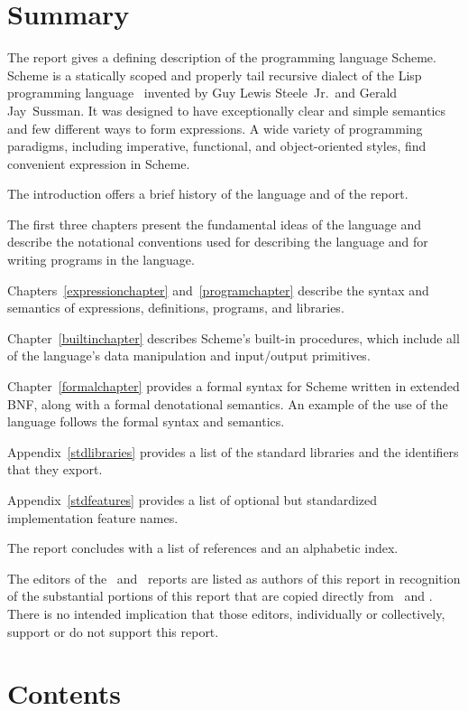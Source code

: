 \chapter*{Summary}

The report gives a defining description of the programming language
Scheme.  Scheme is a statically scoped and properly tail recursive
dialect of the Lisp programming language~\cite{McCarthy} invented by Guy Lewis
Steele~Jr.\ and Gerald Jay~Sussman.  It was designed to have
exceptionally clear and simple semantics and few different ways to
form expressions.  A wide variety of programming paradigms, including
imperative, functional, and object-oriented styles, find convenient
expression in Scheme.

\vest The introduction offers a brief history of the language and of
the report.

\vest The first three chapters present the fundamental ideas of the
language and describe the notational conventions used for describing the
language and for writing programs in the language.

\vest Chapters~\ref{expressionchapter} and~\ref{programchapter} describe
the syntax and semantics of expressions, definitions, programs, and libraries.

\vest Chapter~\ref{builtinchapter} describes Scheme's built-in
procedures, which include all of the language's data manipulation and
input/output primitives.

\vest Chapter~\ref{formalchapter} provides a formal syntax for Scheme
written in extended BNF, along with a formal denotational semantics.
An example of the use of the language follows the formal syntax and
semantics.

\vest Appendix~\ref{stdlibraries} provides a list of the standard libraries
and the identifiers that they export.

\vest Appendix~\ref{stdfeatures} provides a list of optional but standardized
implementation feature names.


\vest The report concludes with a list of references and an
alphabetic index.

\begin{note}
The editors of the \rfivers\ and \rsixrs\ reports are
listed as authors of this report in recognition of the substantial
portions of this report that are copied directly from \rfivers\ and \rsixrs.
There is no intended implication that those editors, individually or
collectively, support or do not support this report.
\end{note}


\vfill
\eject

\chapter*{Contents}
\addvspace{3.5pt}                  %
\renewcommand{\tocshrink}{-3.5pt}  %
{\footnotesize
\tableofcontents
}

\vfill
\eject
